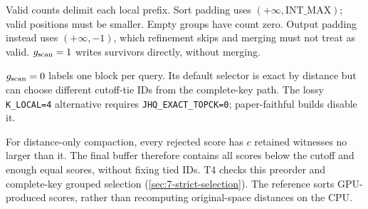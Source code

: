 Valid counts delimit each local prefix. Sort padding uses $(+\infty,\mathrm{INT\_MAX})$; valid positions must be smaller. Empty groups have count zero. Output padding instead uses $(+\infty,-1)$, which refinement skips and merging must not treat as valid. $g_{\mathrm{scan}}=1$ writes survivors directly, without merging.

$g_{\mathrm{scan}}=0$ labels one block per query. Its default selector is exact by distance but can choose different cutoff-tie IDs from the complete-key path. The lossy \texttt{K\_LOCAL=4} alternative requires \texttt{JHQ\_EXACT\_TOPCK=0}; paper-faithful builds disable it.

For distance-only compaction, every rejected score has $c$ retained witnesses no larger than it. The final buffer therefore contains all scores below the cutoff and enough equal scores, without fixing tied IDs. T4 checks this preorder and complete-key grouped selection (\cref{sec:7-strict-selection}). The reference sorts GPU-produced scores, rather than recomputing original-space distances on the CPU.